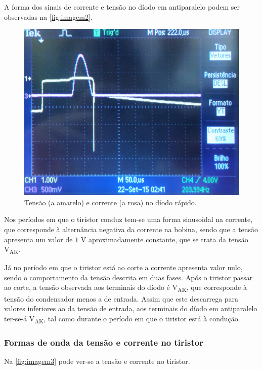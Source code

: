 \documentclass[a4paper,11pt]{article}
\numberwithin{equation}{section}
\begin{document}
A forma dos sinais de corrente e tensão no díodo em antiparalelo podem ser observadas na \autoref{fig:imagem2}.

\begin{figure}[h]
	\centering
	\includegraphics[keepaspectratio=true, scale=0.12]{img/imagem2}
	\caption{Tensão (a amarelo) e corrente (a rosa) no díodo rápido.}
	\label{fig:imagem2}
	\vspace{-0.8em}
\end{figure}

Nos períodos em que o tiristor conduz tem-se uma forma sinusoidal na corrente, que corresponde à alternância negativa da corrente na bobina, sendo que a tensão apresenta um valor de $1$ V aproximadamente constante, que se trata da tensão V\textsubscript{AK}. 

Já no período em que o tiristor está ao corte a corrente apresenta valor nulo, sendo o comportamento da tensão descrita em duas fases. Após o tiristor passar ao corte, a tensão observada aos terminais do díodo é V\textsubscript{AK}, que corresponde à tensão do condensador menos a de entrada. Assim que este descarrega para valores inferiores ao da tensão de entrada, aos terminais do díodo em antiparalelo ter-se-á V\textsubscript{AK}, tal como durante o período em que o tiristor está à condução.

\subsubsection{Formas de onda da tensão e corrente no tiristor}

Na \autoref{fig:imagem3} pode ver-se a tensão e corrente no tiristor.
\end{document}
